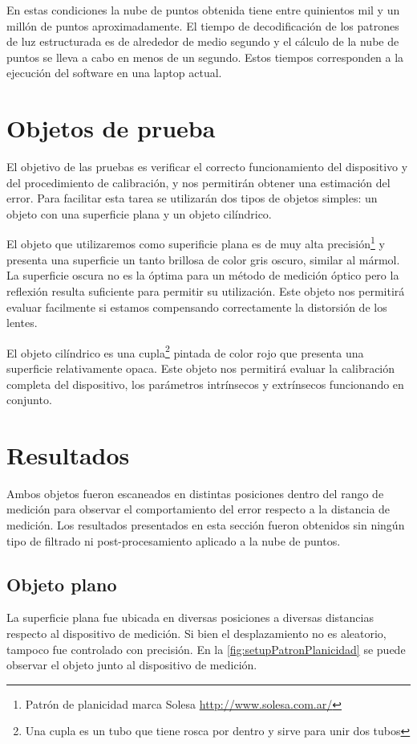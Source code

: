 En estas condiciones la nube de puntos obtenida tiene entre quinientos mil y un millón de puntos aproximadamente. El tiempo de decodificación de los patrones de luz estructurada es de alrededor de medio segundo y el cálculo de la nube de puntos se lleva a cabo en menos de un segundo. Estos tiempos corresponden a la ejecución del software en una laptop actual.

\section{Objetos de prueba}
El objetivo de las pruebas es verificar el correcto funcionamiento del dispositivo y del procedimiento de calibración, y nos permitirán obtener una estimación del error. Para facilitar esta tarea se utilizarán dos tipos de objetos simples: un objeto con una superficie plana y un objeto cilíndrico. 

El objeto que utilizaremos como superificie plana es de muy alta precisión\footnote{Patrón de planicidad marca Solesa \url{http://www.solesa.com.ar/}} y presenta una superficie un tanto brillosa de color gris oscuro, similar al mármol. La superficie oscura no es la óptima para un método de medición óptico pero la reflexión resulta suficiente para permitir su utilización. Este objeto nos permitirá evaluar facilmente si estamos compensando correctamente la distorsión de los lentes. 

El objeto cilíndrico es una cupla\footnote{Una cupla es un tubo que tiene rosca por dentro y sirve para unir dos tubos} pintada de color rojo que presenta una superficie relativamente opaca. Este objeto nos permitirá evaluar la calibración completa del dispositivo, los parámetros intrínsecos y extrínsecos funcionando en conjunto. 

\section{Resultados}
Ambos objetos fueron escaneados en distintas posiciones dentro del rango de medición para observar el comportamiento del error respecto a la distancia de medición. Los resultados presentados en esta sección fueron obtenidos sin ningún tipo de filtrado ni post-procesamiento aplicado a la nube de puntos. 

\subsection{Objeto plano}
La superficie plana fue ubicada en diversas posiciones a diversas distancias respecto al dispositivo de medición. Si bien el desplazamiento no es aleatorio, tampoco fue controlado con precisión. En la \autoref{fig:setupPatronPlanicidad} se puede observar el objeto junto al dispositivo de medición.

